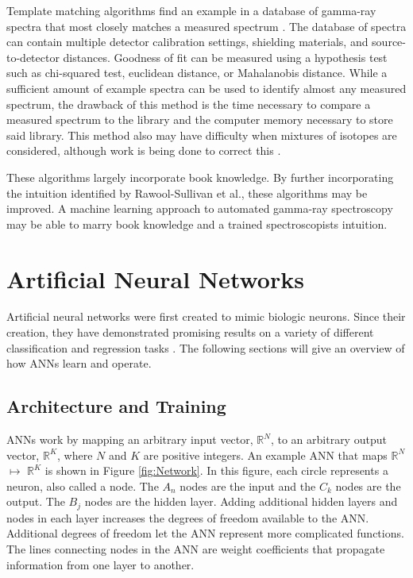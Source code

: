 \documentclass[tocnosub,noragright,centerchapter,12pt,fullpage]{uiucecethesis09}
\begin{document}
Template matching algorithms find an example in a database of gamma-ray spectra that most closely matches a measured spectrum \cite{burr2009}. The database of spectra can contain multiple detector calibration settings, shielding materials, and source-to-detector distances. Goodness of fit can be measured using a hypothesis test such as chi-squared test, euclidean distance, or Mahalanobis distance. While a sufficient amount of example spectra can be used to identify almost any measured spectrum, the drawback of this method is the time necessary to compare a measured spectrum to the library and the computer memory necessary to store said library. This method also may have difficulty when mixtures of isotopes are considered, although work is being done to correct this \cite{mattingly2010}.

These algorithms largely incorporate book knowledge. By further incorporating the intuition identified by Rawool-Sullivan et al., these algorithms may be improved. A machine learning approach to automated gamma-ray spectroscopy may be able to marry book knowledge and a trained spectroscopists intuition.  




\section{Artificial Neural Networks}

Artificial neural networks were first created to mimic biologic neurons. Since their creation, they have demonstrated promising results on a variety of different classification and regression tasks \cite{Jeyanthia2015, Krizhevsky2012, Rababaah2015}. The following sections will give an overview of how ANNs learn and operate.


\subsection{Architecture and Training}

ANNs work by mapping an arbitrary input vector, $\mathbb{R}^N$, to an arbitrary output vector, $\mathbb{R}^K$, where $N$ and $K$ are positive integers. An example ANN that maps $\mathbb{R}^N$ $\mapsto$ $\mathbb{R}^K$ is shown in Figure \ref{fig:Network}. In this figure, each circle represents a neuron, also called a node. The $A_{n}$ nodes are the input and the $C_{k}$ nodes are the output. The $B_{j}$ nodes are the hidden layer. Adding additional hidden layers and nodes in each layer increases the degrees of freedom available to the ANN. Additional degrees of freedom let the ANN represent more complicated functions. The lines connecting nodes in the ANN are weight coefficients that propagate information from one layer to another. 
\end{document}

